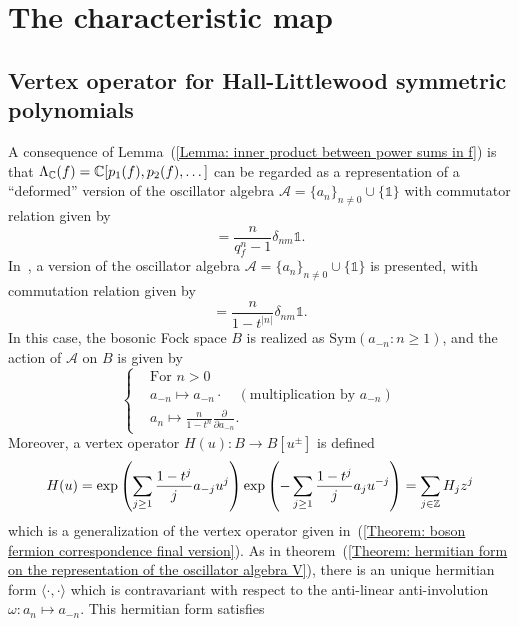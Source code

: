 \section{The characteristic map}
\subsection{Vertex operator for Hall-Littlewood symmetric polynomials}
A consequence of Lemma~(\ref{Lemma: inner product between power sums in f}) is that $\Lambda_{\mathbb{C}}(f)=\mathbb{C}[p_1(f),p_2(f),\dots]$ can be regarded as a representation of a ``deformed'' version of the oscillator algebra $\mathcal{A}=\{a_n\}_{n\neq0}\cup\{\mathds{1}\}$ with commutator relation given by
\begin{equation}
    [a_n,a_m]=\frac{n}{q_f^n-1}\delta_{nm}\mathds{1}.
\end{equation}
In~\cite{jing1991vertex}, a version of the oscillator algebra $\mathcal{A}=\{a_n\}_{n\neq0}\cup\{\mathds{1}\}$ is presented, with commutation relation given by
\begin{equation}
     [a_n,a_m]=\frac{n}{1-t^{|n|}}\delta_{nm}\mathds{1}.
\end{equation}
In this case, the bosonic Fock space $B$ is realized as $\text{Sym}(a_{-n}:n\geq1)$, and the action of $\mathcal{A}$ on $B$ is given by
\begin{equation}
    \left\{\begin{aligned}
        &\text{For }n>0\\
        &a_{-n}\mapsto a_{-n}\cdot\quad (\text{multiplication by }a_{-n})\\
        &a_n\mapsto \frac{n}{1-t^n}\frac{\partial}{\partial a_{-n}}.
    \end{aligned}\right.
\end{equation}
Moreover, a vertex operator $H(u): B\rightarrow B[u^\pm]$ is defined
\begin{equation}\label{Equation: Jing vertex operator H}
    H(u) = \exp\left(\sum_{j\geq1}\frac{1-t^j}{j}a_{-j}u^j\right)\exp\left(-\sum_{j\geq1}\frac{1-t^j}{j}a_ju^{-j}\right) =\sum_{j\in\mathbb{Z}}H_jz^j
\end{equation}
which is a generalization of the vertex operator given in~(\ref{Theorem: boson fermion correspondence final version}). As in theorem~(\ref{Theorem: hermitian form on the representation of the oscillator algebra V}), there is an unique hermitian form $\langle\cdot,\cdot\rangle$ which is contravariant with respect to the anti-linear anti-involution $\omega: a_n\mapsto a_{-n}$. This hermitian form satisfies
